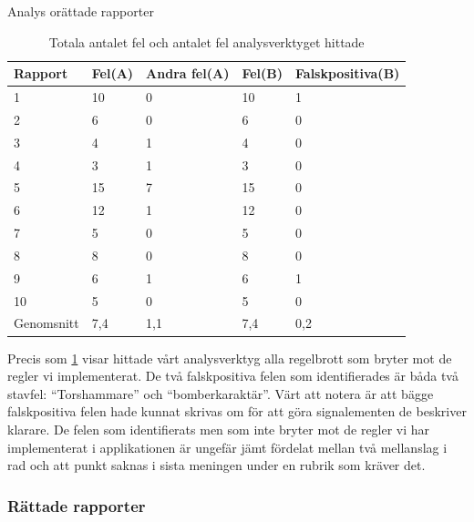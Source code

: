 \documentclass[swedish]{maucsthesis}
\begin{document}
\begin{table}[H]
\centering
\caption{Analys orättade rapporter}
\begin{tabular}{|l|l|l|l|l|}
\hline
Rapport    & Fel(A) & Andra fel(A) & Fel(B) & Falskpositiva(B) \\ \hline
1          & 10         & 0         & 10               & 1             \\ \hline
2          & 6          & 0         & 6                & 0             \\ \hline
3          & 4          & 1         & 4                & 0             \\ \hline
4          & 3          & 1         & 3                & 0             \\ \hline
5          & 15         & 7         & 15               & 0             \\ \hline
6          & 12         & 1         & 12               & 0             \\ \hline
7          & 5          & 0         & 5                & 0             \\ \hline
8          & 8          & 0         & 8                & 0             \\ \hline
9          & 6          & 1         & 6                & 1             \\ \hline
10         & 5          & 0         & 5                & 0             \\ \hline
Genomsnitt & 7,4        & 1,1       & 7,4              & 0,2           \\ \hline
\end{tabular}
\caption*{Totala antalet fel och antalet fel analysverktyget hittade}
\label{ungradedtable}
\end{table}

Precis som \cref{ungradedtable} visar hittade vårt analysverktyg alla regelbrott som bryter mot de regler vi implementerat. De två falskpositiva felen som identifierades är båda två stavfel: ``Torshammare'' och ``bomberkaraktär''. 
Värt att notera är att bägge falskpositiva felen hade kunnat skrivas om för att göra signalementen de beskriver klarare. De felen som identifierats men som inte bryter mot 
de regler vi har implementerat i applikationen är ungefär jämt fördelat mellan två mellanslag i rad och att punkt saknas i sista meningen under en rubrik som kräver det.

\subsubsection{Rättade rapporter}
\end{document}
